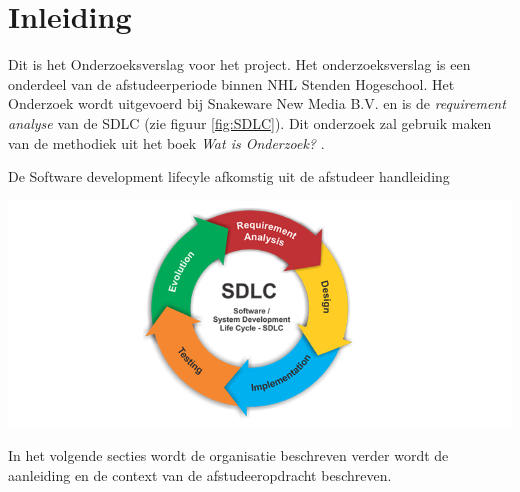 \chapter{Inleiding}
Dit is het Onderzoeksverslag voor het  project.
Het onderzoeksverslag is een onderdeel van de afstudeerperiode binnen NHL Stenden Hogeschool.
Het Onderzoek wordt uitgevoerd bij Snakeware New Media B.V. en is de \textit{requirement analyse} van de \gls{SDLC} (zie figuur \ref{fig:SDLC}).
Dit onderzoek zal gebruik maken van de methodiek uit het boek \textit{Wat is Onderzoek?} \Parencite{Verhoeven}.

\whitespace
\begin{graphic}
    \vspace{0.2cm}
    \captionsetup{type=figure}
    \caption{De Software development lifecyle afkomstig uit de afstudeer handleiding \Parencite{Afstudeerhandleiding}}
    \includegraphics[scale=0.5]{img/SDLC.png}
    \label{fig:SDLC}
    \vspace{0.2cm}
\end{graphic}

\whitespace
In het volgende secties wordt de organisatie beschreven verder wordt de aanleiding en de context van de afstudeeropdracht beschreven.




% 

